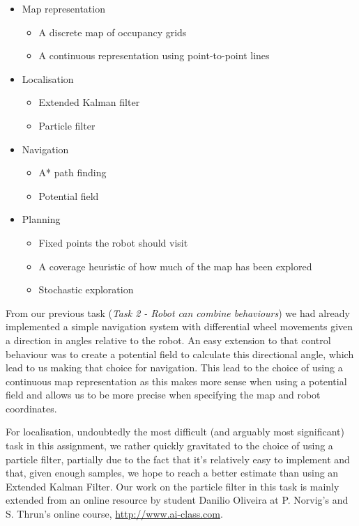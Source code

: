 \documentclass[paper=a4, fontsize=12pt]{scrartcl}	%
\numberwithin{equation}{section}		%
\numberwithin{figure}{section}			%
\numberwithin{table}{section}				%
\begin{document}
\begin{itemize}
\item Map representation 
\begin{itemize}
\item A discrete map of occupancy grids
\item A continuous representation using point-to-point lines
\end{itemize}
\item Localisation
\begin{itemize}
\item Extended Kalman filter
\item Particle filter
\end{itemize}
\item Navigation
\begin{itemize}
\item A* path finding
\item Potential field
\end{itemize}
\item Planning
\begin{itemize}
\item Fixed points the robot should visit
\item A coverage heuristic of how much of the map has been explored
\item Stochastic exploration
\end{itemize}
\end{itemize}

From our previous task (\emph{Task 2 - Robot can combine behaviours}) we had already implemented a simple navigation system with differential wheel movements given a direction in angles relative to the robot. An easy extension to that control behaviour was to create a potential field to calculate this directional angle, which lead to us making that choice for navigation. This lead to the choice of using a continuous map representation as this makes more sense when using a potential field and allows us to be more precise when specifying the map and robot coordinates.

For localisation, undoubtedly the most difficult (and arguably most significant) task in this assignment, we rather quickly gravitated to the choice of using a particle filter, partially due to the fact that it's relatively easy to implement and that, given enough samples, we hope to reach a better estimate than using an Extended Kalman Filter. Our work on the particle filter in this task is mainly extended from an online resource by student Danilio Oliveira at P. Norvig's and S. Thrun's online course, \url{http://www.ai-class.com}. \cite{oliveira}\cite{aiclass}
\end{document}
